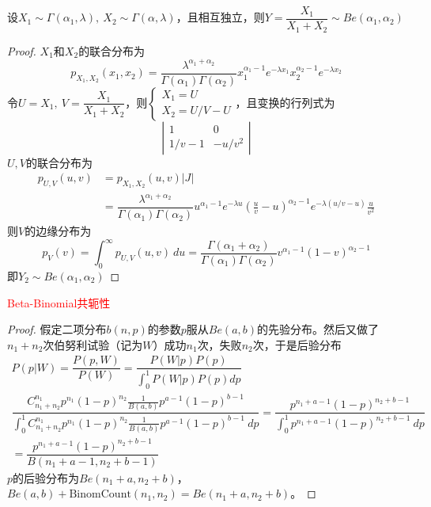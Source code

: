 设$X_1\sim \Gamma(\alpha_1, \lambda),\ X_2\sim \Gamma(\alpha, \lambda)$，且相互独立，则$Y = \dfrac{X_1}{X_1+X_2}\sim Be(\alpha_1, \alpha_2)$
\begin{proof}
    $X_1$和$X_2$的联合分布为
    \[
        p_{X_1,X_2}(x_1,x_2) = \dfrac{\lambda^{\alpha_1 + \alpha_2}}{\Gamma(\alpha_1)\Gamma(\alpha_2)}x_{1}^{\alpha_1-1}e^{-\lambda x_1}x_{2}^{\alpha_2-1}e^{-\lambda x_2}
    \]
    令$U= X_1,\ V = \dfrac{X_1}{X_1+  X_2}$，则$\left\{\begin{array}{l}
        X_1 = U\\
        X_2 = U/V-U
    \end{array}\right.$，且变换的行列式为
    \[
        \left\lvert \begin{matrix}
            1 & 0\\
            1/v-1& -u/v^2
        \end{matrix}\right\rvert 
    \]
    $U,V$的联合分布为
    \[
        \begin{array}{ll}
            p_{U,V}(u,v) &= p_{X_1,X_2}(u,v)|J|\\
            &=\dfrac{\lambda^{\alpha_1+\alpha_2}}{\Gamma(\alpha_1)\Gamma(\alpha_2)}u^{\alpha_1-1}e^{-\lambda u}(\frac{u}{v}-u)^{\alpha_2-1}e^{-\lambda(u/v-u)}\frac{u}{v^2}
        \end{array}
    \]
    则$V$的边缘分布为
    \[
        p_{V}(v) = \displaystyle\int_{0}^{\infty} p_{U, V}(u,v)\ du =\dfrac{\Gamma(\alpha_1+\alpha_2)}{\Gamma(\alpha_1)\Gamma(\alpha_2)}v^{\alpha_1-1}(1-v)^{\alpha_2-1}
    \]
    即$Y_2\sim Be(\alpha_1, \alpha_2)$
\end{proof}

\textcolor{red}{Beta-Binomial共轭性}
\begin{proof}
    假定二项分布$b(n,p)$的参数$p$服从$Be(a,b)$的先验分布。然后又做了$n_1+n_2$次伯努利试验（记为$W$）成功$n_1$次，失败$n_2$次，于是后验分布
    \[
        \begin{array}{l}
            P(p|W) = \dfrac{P(p,W)}{P(W)} = \dfrac{P(W|p)P(p)}{\int_{0}^{1}P(W|p)P(p)dp}\\
            \dfrac{C_{n_1+n_2}^{n_1}p^{n_1}(1-p)^{n_2}\frac{1}{B(a,b)}p^{a-1}(1-p)^{b-1}}{\int_{0}^{1}C_{n_1+n_2}^{n_1}p^{n_1}(1-p)^{n_2}\frac{1}{B(a,b)}p^{a-1}(1-p)^{b-1}\ dp}=\dfrac{p^{n_1+a-1}(1-p)^{n_2+b-1}}{\int_{0}^{1}p^{n_1+a-1}(1-p)^{n_2+b-1}\ dp}\\
            = \dfrac{p^{n_1+a-1}(1-p)^{n_2+b-1}}{B(n_1+a-1,n_2+b-1)}
        \end{array}
    \]
    $p$的后验分布为$Be(n_1+a, n_2+b)$，$Be(a,b) + \mathrm{BinomCount}(n_1, n_2) = Be(n_1 + a, n_2 + b)$。
\end{proof}

